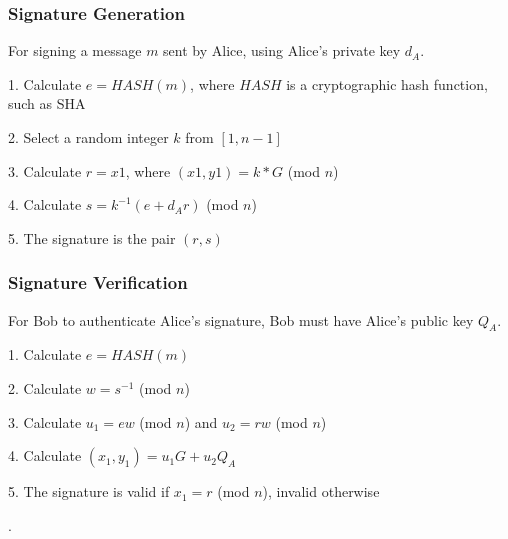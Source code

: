 \documentclass[12pt,a4paper]{article}
\begin{document}
\subsubsection{Signature Generation}\noindent \label{Signature Generation}
For signing a message $m$ sent by Alice, using Alice's private key $d_A$.

\vspace{1mm}

1. \space Calculate $e = HASH(m)$, where $HASH$ is a cryptographic hash function, such as SHA

2. \space Select a random integer $k$ from $[1,n-1]$

3. \space Calculate $r = x1$, where $(x1,y1) = k * G$ (mod $n$)

4. \space Calculate $s = k^{-1}(e+d_Ar)$ (mod $n$)

5. \space The signature is the pair $(r,s)$

\subsubsection{Signature Verification}\noindent \label{Signature Verification}
For Bob to authenticate Alice's signature, Bob must have Alice's public key $Q_A$.

\vspace{1mm}

1. \space Calculate $e = HASH(m)$

2. \space Calculate $w = s^{-1}$ (mod $n$)

3. \space Calculate $u_1 = ew$ (mod $n$) and $u_2 = rw$ (mod $n$)

4. \space Calculate $(x_1,y_1) = u_1G + u_2Q_A$

5. \space The signature is valid if $x_1 = r$ (mod $n$), invalid otherwise

\vspace{2mm}

\cite{jurivsic1997elliptic,koblitz2000state,hankerson2003guide,anoop2007elliptic,silverman2009arithmetic,brown2009standards}.

\vspace{5mm}
\end{document}
